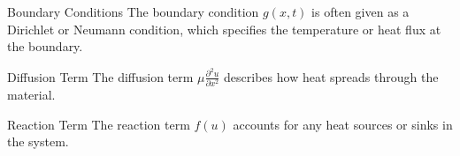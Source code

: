 \begin{remark}{Boundary Conditions}{}
    The boundary condition $g(x, t)$ is often given as a Dirichlet or Neumann condition, which specifies the temperature or heat flux at the boundary.
\end{remark}

\begin{remark}{Diffusion Term}{}
    The diffusion term $\mu \frac{\partial^2 u}{\partial x^2}$ describes how heat spreads through the material.
\end{remark}

\begin{remark}{Reaction Term}{}
    The reaction term $f(u)$ accounts for any heat sources or sinks in the system.
\end{remark}
